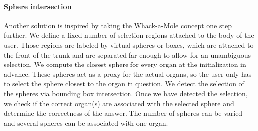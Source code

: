 \paragraph{Sphere intersection}
Another solution is inspired by taking the Whack-a-Mole concept one step further. We define a fixed number of selection regions attached to the body of the user. Those regions are labeled by virtual spheres or boxes, which are attached to the front of the trunk and are separated far enough to allow for an unambiguous selection. We compute the closest sphere for every organ at the initialization in advance. These spheres act as a proxy for the actual organs, so the user only has to select the sphere closest to the organ in question. 
We detect the selection of the spheres via bounding box intersection.
Once we have detected the selection, we check if the correct organ(s) are associated with the selected sphere and determine the correctness of the answer. The number of spheres can be varied and several spheres can be associated with one organ. 


